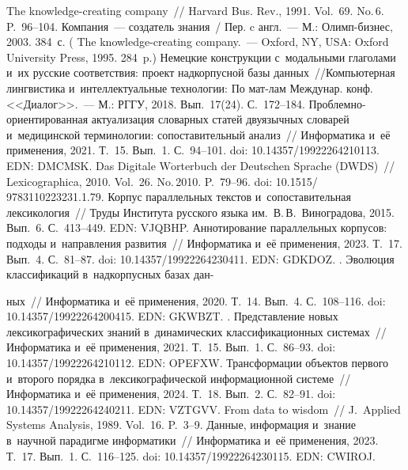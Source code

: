\begin{multicols}{2}
{{\begin{thebibliography}{99}
 The knowledge-creating company~// Harvard Bus. Rev., 1991. Vol.~69. 
No.\,6. P.~96--104.
 Компания~--- создатель знания~/ Пер. c англ.~--- М.:  
Олимп-биз\-нес, 2003. 384~с. ( The knowledge-creating 
company.~--- Oxford, NY, USA: Oxford University Press, 1995. 284~p.)
 Немецкие конструкции с~модальными 
глаголами и~их русские соответствия: проект надкорпусной базы данных~//\linebreak Компьютерная 
лингвистика и~интеллектуальные технологии: По мат-лам Междунар. конф. <<Диалог>>.~--- 
М.: РГГУ, 2018. Вып.~17(24). С.~172--184.
 Проб\-лем\-но-ори\-ен\-ти\-ро\-ван\-ная актуализация словарных ста\-тей 
двуязычных словарей и~медицинской терминологии: сопоставительный анализ~// 
Информатика и~её применения, 2021. Т.~15. Вып.~1. С.~94--101. doi: 10.14357/19922264210113. 
EDN: \mbox{DMCMSK}.
 Das Digitale W$\ddot{\mbox{o}}$rterbuch der Deutschen Sprache 
(DWDS)~// Lexicographica, 2010. Vol.~26. No.\,2010. P.~79--96. doi: 
10.1515/ 9783110223231.1.79.
 Корпус параллельных текс\-тов и~сопоставительная лексикология~// 
Труды Института русского языка им.\ В.\,В.~Виноградова, 2015. Вып.~6. С.~413--449. EDN: 
VJQBHP.
 Аннотирование параллельных кор\-пу\-сов: подходы и~на\-прав\-ле\-ния 
развития~// Информатика и~её применения, 2023. Т.~17.  Вып.~4. С.~81--87. doi: 
10.14357/19922264230411. EDN: GDKDOZ.
. Эволюция классификаций 
в~надкорпусных базах дан-\linebreak\vspace*{-12pt}

\pagebreak

\noindent
ных~// Информатика и~её применения, 2020. Т.~14. Вып.~4.  
С.~108--116. doi: 10.14357/19922264200415. EDN: \mbox{GKWBZT}.
. Пред\-став\-ле\-ние новых 
лексикографических знаний в~динамических классификационных сис\-те\-мах~// Информатика 
и~её применения, 2021. Т.~15. Вып.~1. С.~86--93. doi: 10.14357/19922264210112. EDN: OPEFXW.
 Трансформации объектов первого и~второго порядка 
в~лексикографической информационной сис\-те\-ме~// Информатика и~её применения, 2024. 
Т.~18. Вып.~2. С.~82--91. doi: 10.14357/19922264240211. EDN: VZTGVV.
 From data to wisdom~// J.~Applied Systems Analysis, 1989. Vol.~16. P.~3--9.
 Данные, информация и~знание в~научной парадигме информатики~// 
Информатика и~её применения, 2023. Т.~17. Вып.~1. С.~116--125. doi: 
10.14357/19922264230115. EDN: CWIROJ.


\end{thebibliography}}}
\end{multicols}
